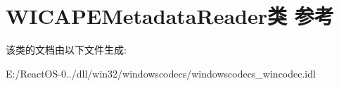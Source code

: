 \hypertarget{class_w_i_c_a_p_e_metadata_reader}{}\section{W\+I\+C\+A\+P\+E\+Metadata\+Reader类 参考}
\label{class_w_i_c_a_p_e_metadata_reader}


该类的文档由以下文件生成\+:\begin{DoxyCompactItemize}
\item 
E\+:/\+React\+O\+S-\/0../dll/win32/windowscodecs/windowscodecs\+\_\+wincodec.\+idl\end{DoxyCompactItemize}

